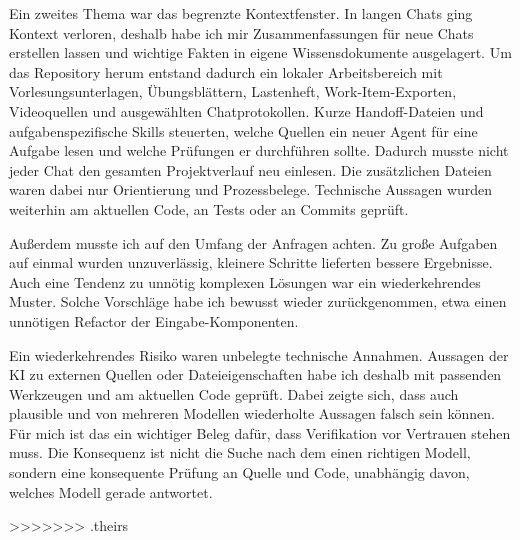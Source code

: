 Ein zweites Thema war das begrenzte Kontextfenster. In langen Chats ging Kontext verloren,
deshalb habe ich mir Zusammenfassungen für neue Chats erstellen lassen und wichtige Fakten
in eigene Wissensdokumente ausgelagert. Um das Repository herum entstand dadurch ein lokaler
Arbeitsbereich mit Vorlesungsunterlagen, Übungsblättern, Lastenheft, Work-Item-Exporten,
Videoquellen und ausgewählten Chatprotokollen. Kurze Handoff-Dateien und
aufgabenspezifische Skills steuerten, welche Quellen ein neuer Agent für eine Aufgabe lesen
und welche Prüfungen er durchführen sollte. Dadurch musste nicht jeder Chat den gesamten
Projektverlauf neu einlesen. Die zusätzlichen Dateien waren dabei nur Orientierung und
Prozessbelege. Technische Aussagen wurden weiterhin am aktuellen Code, an Tests oder an
Commits geprüft.

Außerdem musste ich auf den Umfang der Anfragen achten. Zu große Aufgaben auf einmal wurden
unzuverlässig, kleinere Schritte lieferten bessere Ergebnisse. Auch eine Tendenz zu unnötig
komplexen Lösungen war ein wiederkehrendes Muster. Solche Vorschläge habe ich bewusst wieder
zurückgenommen, etwa einen unnötigen Refactor der Eingabe-Komponenten.

Ein wiederkehrendes Risiko waren unbelegte technische Annahmen. Aussagen der KI zu
externen Quellen oder Dateieigenschaften habe ich deshalb mit passenden Werkzeugen und am
aktuellen Code geprüft. Dabei zeigte sich, dass auch plausible und von mehreren Modellen
wiederholte Aussagen falsch sein können. Für mich ist das ein wichtiger Beleg dafür, dass
Verifikation vor Vertrauen stehen muss. Die Konsequenz ist nicht die Suche nach dem einen
richtigen Modell, sondern eine konsequente Prüfung an Quelle und Code, unabhängig davon,
welches Modell gerade antwortet.

>>>>>>> .theirs
